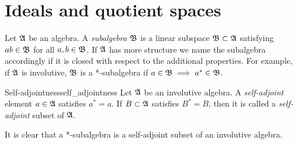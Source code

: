 \section{Ideals and quotient spaces}
Let \(\mathfrak{A}\) be an algebra. A \emph{subalgebra} \(\mathfrak{B}\) is a linear subspace \(\mathfrak{B} \subset \mathfrak{A}\) satisfying \(ab \in \mathfrak{B}\) for all \(a, b \in \mathfrak{B}\). If \(\mathfrak{A}\) has more structure we name the subalgebra accordingly if it is closed with respect to the additional properties. For example, if \(\mathfrak{A}\) is involutive, \(\mathfrak{B}\) is a *-subalgebra if \(a \in \mathfrak{B} \implies a^* \in \mathfrak{B}\).
\begin{definition}{Self-adjointness}{self_adjointness}
    Let \(\mathfrak{A}\) be an involutive algebra. A \emph{self-adjoint} element \(a \in \mathfrak{A}\) satisfies \(a^* = a\). If \(B \subset \mathfrak{A}\) satisfies \(B^* = B\), then it is called a \emph{self-adjoint} subset of \(\mathfrak{A}\).
\end{definition}
\begin{remark}
    It is clear that a *-subalgebra is a self-adjoint subset of an involutive algebra.
\end{remark}

